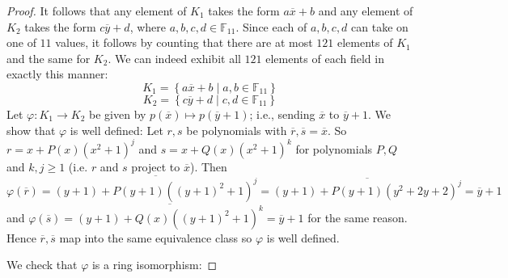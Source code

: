 \documentclass[11pt]{article}
\newcommand{\cbr}[1]{\left\{#1\right\}}
\begin{document}
\begin{enumerate}
\begin{proof}
        It follows that any element of $K_1$ takes the form $a\overline{x} + b$ and any element of $K_2$ takes the form $c\overline{y} + d$, where $a,b,c,d\in \mathbb{F}_{11}$. Since each of $a,b,c,d$ can take on one of $11$ values, it follows by counting that there are at most $121$ elements of $K_1$ and the same for $K_2$. We can indeed exhibit all $121$ elements of each field in exactly this manner: \[K_1 = \cbr{a\overline{x}+ b\mid a,b\in \mathbb{F}_{11}}\] \[K_2 = \cbr{c\overline{y}+ d\mid c,d\in \mathbb{F}_{11}}\]
        Let $\varphi\colon K_1\to K_2$ be given by $p(\overline{x})\mapsto p(\overline{y}+1)$; i.e., sending $\overline{x}$ to $\overline{y}+1$. We show that $\varphi$ is well defined: Let $r,s$ be polynomials with $\overline{r},\overline{s} = \overline{x}$. So $r = x+ P(x)(x^2+1)^j$ and $s = x+Q(x)(x^2+1)^k$ for polynomials $P,Q$ and $k,j\geq 1$ (i.e. $r$ and $s$ project to $\overline{x}$). Then $\varphi(\overline{r}) = \overline{(y+1)+ P(y+1)((y+1)^2+1)^j} = \overline{(y+1)+ P(y+1)(y^2+2y+2)^j} = \overline{y}+1$ and $\varphi(\overline{s}) = \overline{(y+1)+Q(x)((y+1)^2+1)^k} = \overline{y}+1$ for the same reason. Hence $\overline{r},\overline{s}$ map into the same equivalence class so $\varphi$ is well defined.

        We check that $\varphi$ is a ring isomorphism: 
        

\end{proof}
\end{enumerate}
\end{document}
